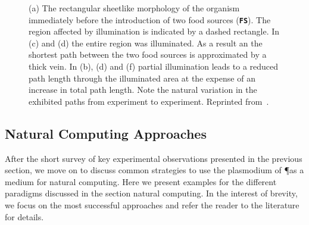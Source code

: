 			\begin{figure}[htp]
				\centering
				\newline
				\newline

				\caption[Classic maze experiment with \P]{(a)  The  rectangular  sheetlike  morphology  of  the organism  immediately  before  the  introduction  of  two  food sources (\textbf{\texttt{FS}}). The region affected by illumination is indicated by a dashed rectangle. In (c) and (d) the entire region was illuminated. As a result an the shortest path between the two food sources is approximated by a thick vein. In (b), (d) and (f) partial illumination leads to a reduced path length through the illuminated area at the expense of an increase in total path length. Note the natural variation in the exhibited paths from experiment to experiment. Reprinted from~\cite{PhysRevLett.99.068104}.}
				\label{fig:snell}
			\end{figure}

			\FloatBarrier

	\subsection{Natural Computing Approaches}

		After the short survey of key experimental observations presented in the previous section, we move on to discuss common strategies to use the plasmodium of \P as a medium for natural computing. Here we present examples for the different paradigms discussed in the section natural computing. In the interest of brevity, we focus on the most successful approaches and refer the reader to the literature for details.


